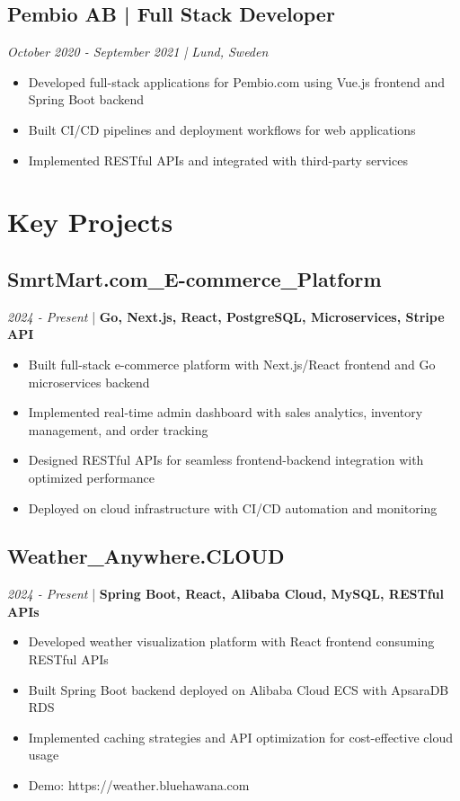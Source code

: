 \documentclass[11pt,a4paper]{article}
\begin{document}
\subsection*{Pembio AB | Full Stack Developer}
\textit{October 2020 - September 2021 | Lund, Sweden}
\begin{itemize}[noitemsep]
\item Developed full-stack applications for Pembio.com using Vue.js frontend and Spring Boot backend
\item Built CI/CD pipelines and deployment workflows for web applications
\item Implemented RESTful APIs and integrated with third-party services
\end{itemize}

\section*{Key Projects}

\subsection*{SmrtMart.com\_E-commerce\_Platform}
\textit{2024 - Present} | \textbf{Go, Next.js, React, PostgreSQL, Microservices, Stripe API}
\begin{itemize}[noitemsep]
\item Built full-stack e-commerce platform with Next.js/React frontend and Go microservices backend
\item Implemented real-time admin dashboard with sales analytics, inventory management, and order tracking
\item Designed RESTful APIs for seamless frontend-backend integration with optimized performance
\item Deployed on cloud infrastructure with CI/CD automation and monitoring
\end{itemize}

\subsection*{Weather\_Anywhere.CLOUD}
\textit{2024 - Present} | \textbf{Spring Boot, React, Alibaba Cloud, MySQL, RESTful APIs}
\begin{itemize}[noitemsep]
\item Developed weather visualization platform with React frontend consuming RESTful APIs
\item Built Spring Boot backend deployed on Alibaba Cloud ECS with ApsaraDB RDS
\item Implemented caching strategies and API optimization for cost-effective cloud usage
\item Demo: https://weather.bluehawana.com
\end{itemize}
\end{document}
